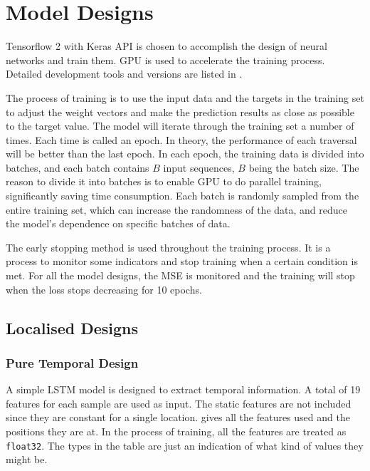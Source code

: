 \chapter{Model Designs} \label{Chapter:Designs}

Tensorflow 2 with Keras API is chosen to accomplish the design of neural networks and train them.
GPU is used to accelerate the training process. Detailed development tools and versions are listed in .

The process of training is to use the input data and the targets in the training set to adjust the weight vectors and make the prediction results as close as possible to the target value. 
The model will iterate through the training set a number of times. Each time is called an epoch. In theory, the performance of each traversal will be better than the last epoch. 
In each epoch, the training data is divided into batches, and each batch contains $B$ input sequences, $B$ being the batch size. 
The reason to divide it into batches is to enable GPU to do parallel training, significantly saving time consumption. 
Each batch is randomly sampled from the entire training set, which can increase the randomness of the data, and reduce the model's dependence on specific batches of data. 

The early stopping method is used throughout the training process. It is a process to monitor some indicators and stop training when a certain condition is met. 
For all the model designs, the MSE is monitored and the training will stop when the loss stops decreasing for 10 epochs. 

\section{Localised Designs}

\subsection{Pure Temporal Design}

A simple LSTM model is designed to extract temporal information. A total of 19 features for each sample are used as input. 
The static features are not included since they are constant for a single location.
 gives all the features used and the positions they are at. In the process of training, all the features are treated as \verb|float32|.
The types in the table are just an indication of what kind of values they might be. 

